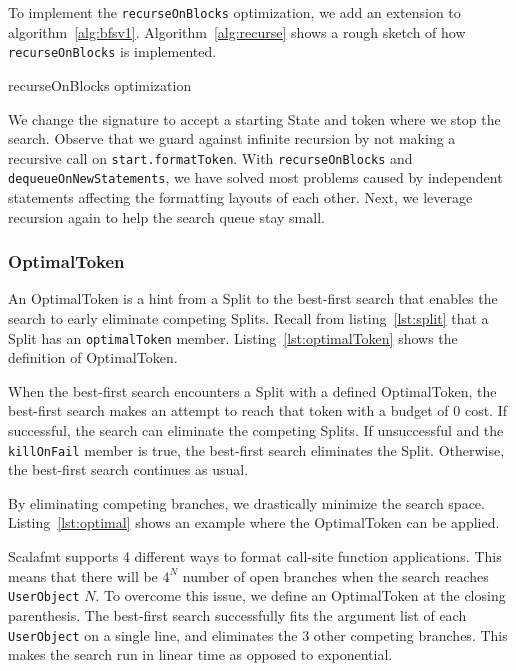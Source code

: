 To implement the \texttt{recurseOnBlocks} optimization, we add an extension to algorithm~\ref{alg:bfsv1}.
Algorithm~\ref{alg:recurse} shows a rough sketch of how \texttt{recurseOnBlocks} is implemented.
\begin{algorithm}
\caption{recurseOnBlocks optimization}\label{alg:recurse}
  
\end{algorithm}
We change the signature to accept a starting State and token where we stop the search.
Observe that we guard against infinite recursion by not making a recursive call on \texttt{start.formatToken}.
With \texttt{recurseOnBlocks} and \texttt{dequeueOnNewStatements}, we have solved most problems caused by independent statements affecting the formatting layouts of each other.
Next, we leverage recursion again to help the search queue stay small.

\subsubsection{OptimalToken}\label{sec:optimal}
An OptimalToken is a hint from a Split to the best-first search that enables the search to early eliminate competing Splits.
Recall from listing~\ref{lst:split} that a Split has an \texttt{optimalToken} member.
Listing~\ref{lst:optimalToken} shows the definition of OptimalToken.

When the best-first search encounters a Split with a defined OptimalToken,
the best-first search makes an attempt to reach that token with a budget of 0 cost.
If successful, the search can eliminate the competing Splits.
If unsuccessful and the \texttt{killOnFail} member is true, the best-first search eliminates the Split.
Otherwise, the best-first search continues as usual.

By eliminating competing branches, we drastically minimize the search space.
Listing~\ref{lst:optimal} shows an example where the OptimalToken can be applied.

Scalafmt supports 4 different ways to format call-site function applications.
This means that there will be $4^N$ number of open branches when the search reaches \texttt{UserObject} $N$.
To overcome this issue, we define an OptimalToken at the closing parenthesis.
The best-first search successfully fits the argument list of each \texttt{UserObject} on a single line, and eliminates the 3 other competing branches.
This makes the search run in linear time as opposed to exponential.

